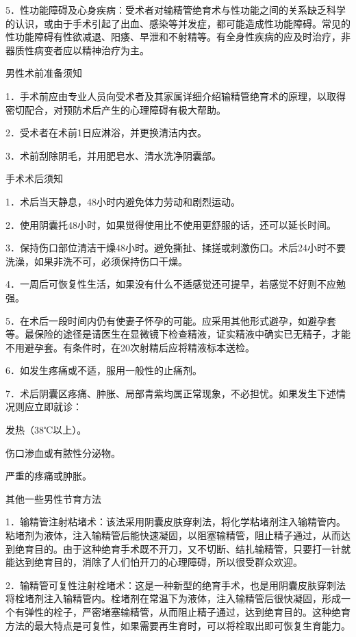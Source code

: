 \documentclass[12pt,UTF8]{ctexbook}
\begin{document}
5．性功能障碍及心身疾病：受术者对输精管绝育术与性功能之间的关系缺乏科学的认识，或由于手术引起了出血、感染等并发症，都可能造成性功能障碍。常见的性功能障碍有性欲减退、阳痿、早泄和不射精等。有全身性疾病的应及时治疗，非器质性病变者应以精神治疗为主。





男性术前准备须知


1．手术前应由专业人员向受术者及其家属详细介绍输精管绝育术的原理，以取得密切配合，对预防术后产生的心理障碍有极大帮助。

2．受术者在术前1日应淋浴，并更换清洁内衣。

3．术前刮除阴毛，并用肥皂水、清水洗净阴囊部。





手术术后须知


1．术后当天静息，48小时内避免体力劳动和剧烈运动。

2．使用阴囊托48小时，如果觉得使用比不使用更舒服的话，还可以延长时间。

3．保持伤口部位清洁干燥48小时。避免撕扯、揉搓或刺激伤口。术后24小时不要洗澡，如果非洗不可，必须保持伤口干燥。

4．一周后可恢复性生活，如果没有什么不适感觉还可提早，若感觉不好则不应勉强。

5．在术后一段时间内仍有使妻子怀孕的可能。应采用其他形式避孕，如避孕套等。最保险的途径是请医生在显微镜下检查精液，证实精液中确实已无精子，才能不用避孕套。有条件时，在20次射精后应将精液标本送检。

6．如发生疼痛或不适，服用一般性的止痛剂。

7．术后阴囊区疼痛、肿胀、局部青紫均属正常现象，不必担忧。如果发生下述情况则应立即就诊：

发热（38℃以上）。

伤口渗血或有脓性分泌物。

严重的疼痛或肿胀。





其他一些男性节育方法


1．输精管注射粘堵术：该法采用阴囊皮肤穿刺法，将化学粘堵剂注入输精管内。粘堵剂为液体，注入输精管后能快速凝固，以阻塞输精管，阻止精子通过，从而达到绝育目的。由于这种绝育手术既不开刀，又不切断、结扎输精管，只要打一针就能达到绝育目的，消除了人们怕开刀的心理障碍，所以很受群众欢迎。

2．输精管可复性注射栓堵术：这是一种新型的绝育手术，也是用阴囊皮肤穿刺法将栓堵剂注入输精管内。栓堵剂在常温下为液体，注入输精管后很快凝固，形成一个有弹性的栓子，严密堵塞输精管，从而阻止精子通过，达到绝育目的。这种绝育方法的最大特点是可复性，如果需要再生育时，可以将栓取出即可恢复生育能力。
\end{document}
